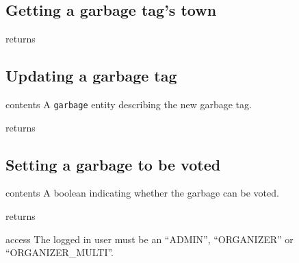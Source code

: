 \subsection{Getting a garbage tag's town}

\begin{apidata}{returns}
  \begin{datalist}
  \end{datalist}
\end{apidata}

\subsection{Updating a garbage tag}

\begin{apidata}{contents}
  A \texttt{garbage} entity describing the new garbage tag.
\end{apidata}
\begin{apidata}{returns}
  \begin{datalist}
  \end{datalist}
\end{apidata}

\subsection{Setting a garbage to be voted}

\begin{apidata}{contents}
  A boolean indicating whether the garbage can be voted.
\end{apidata}
\begin{apidata}{returns}
  \begin{datalist}
  \end{datalist}
\end{apidata}
\begin{apidata}{access}
The logged in user must be an ``ADMIN'', ``ORGANIZER'' or ``ORGANIZER\_MULTI''.
\end{apidata}

